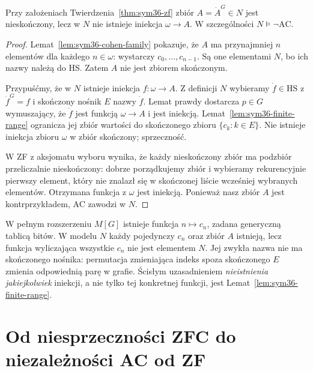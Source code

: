 \begin{twierdzenie}
\label{thm:sym36-dedekind}
Przy założeniach
Twierdzenia~\ref{thm:sym36-zf}
zbiór $A=\dot A^G\in N$ jest
nieskończony, lecz w $N$
nie istnieje iniekcja $\omega\to A$.
W szczególności $N\models\neg\mathrm{AC}$.
\end{twierdzenie}
\begin{proof}
Lemat~\ref{lem:sym36-cohen-family}
pokazuje, że $A$ ma przynajmniej
$n$ elementów dla każdego
$n\in\omega$: wystarczy
$c_0,\ldots,c_{n-1}$.
Są one elementami $N$,
bo ich nazwy należą do HS.
Zatem $A$ nie jest zbiorem skończonym.

Przypuśćmy, że w $N$ istnieje
iniekcja $f:\omega\to A$.
Z definicji $N$ wybieramy
$\dot f\in\mathrm{HS}$ z
$\dot f^G=f$ i skończony
nośnik $E$ nazwy $\dot f$.
Lemat prawdy dostarcza $p\in G$
wymuszający, że $\dot f$
jest funkcją $\omega\to A$
i jest iniekcją.
Lemat~\ref{lem:sym36-finite-range}
ogranicza jej zbiór wartości
do skończonego zbioru
$\{c_k:k\in E\}$.
Nie istnieje iniekcja zbioru
$\omega$ w zbiór skończony;
sprzeczność.

W ZF z aksjomatu wyboru wynika,
że każdy nieskończony zbiór
ma podzbiór przeliczalnie nieskończony:
dobrze porządkujemy zbiór i wybieramy
rekurencyjnie pierwszy element,
który nie znalazł się w skończonej
liście wcześniej wybranych elementów.
Otrzymana funkcja z $\omega$ jest
iniekcją. Ponieważ nasz zbiór $A$
jest kontrprzykładem, AC zawodzi w $N$.
\end{proof}

\begin{przyklad}
\label{ex:sym36-indexing}
W pełnym rozszerzeniu $M[G]$
istnieje funkcja $n\mapsto c_n$,
zadana generyczną tablicą bitów.
W modelu $N$ każdy pojedynczy $c_n$
oraz zbiór $A$ istnieją, lecz
funkcja wyliczająca wszystkie $c_n$
nie jest elementem $N$.
Jej zwykła nazwa nie ma skończonego
nośnika: permutacja zmieniająca
indeks spoza skończonego $E$
zmienia odpowiednią parę w grafie.
Ścisłym uzasadnieniem
\emph{nieistnienia jakiejkolwiek}
iniekcji, a nie tylko tej konkretnej
funkcji, jest
Lemat~\ref{lem:sym36-finite-range}.
\end{przyklad}

\section{Od niesprzeczności ZFC do niezależności AC od ZF}

